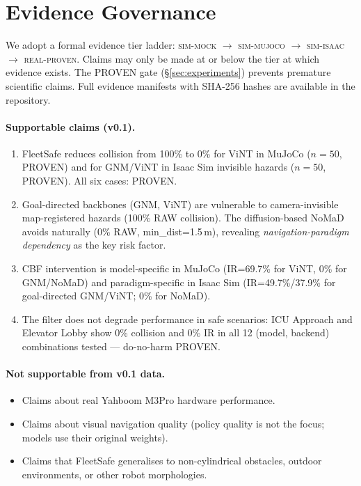 \documentclass[letterpaper]{article}
\begin{document}
\section{Evidence Governance}
\label{sec:governance}

We adopt a formal evidence tier ladder:
\textsc{sim-mock} $\to$ \textsc{sim-mujoco} $\to$ \textsc{sim-isaac}
$\to$ \textsc{real-proven}.
Claims may only be made at or below the tier at which evidence exists.
The PROVEN gate (§\ref{sec:experiments}) prevents premature scientific claims.
Full evidence manifests with SHA-256 hashes are available in the repository.

\paragraph{Supportable claims (v0.1).}
\begin{enumerate}
\item FleetSafe reduces collision from 100\% to 0\% for ViNT in MuJoCo
  ($n=50$, PROVEN) and for GNM/ViNT in Isaac Sim invisible hazards
  ($n=50$, PROVEN). All six cases: PROVEN.
\item Goal-directed backbones (GNM, ViNT) are vulnerable to
  camera-invisible map-registered hazards (100\% RAW collision).
  The diffusion-based NoMaD avoids naturally (0\% RAW, min\_dist=1.5\,m),
  revealing \emph{navigation-paradigm dependency} as the key risk factor.
\item CBF intervention is model-specific in MuJoCo (IR=69.7\% for ViNT,
  0\% for GNM/NoMaD) and paradigm-specific in Isaac Sim
  (IR=49.7\%/37.9\% for goal-directed GNM/ViNT; 0\% for NoMaD).
\item The filter does not degrade performance in safe scenarios:
  ICU Approach and Elevator Lobby show 0\% collision and 0\% IR in
  all 12 (model, backend) combinations tested — do-no-harm PROVEN.
\end{enumerate}

\paragraph{Not supportable from v0.1 data.}
\begin{itemize}
\item Claims about real Yahboom M3Pro hardware performance.
\item Claims about visual navigation quality (policy quality is not the
  focus; models use their original weights).
\item Claims that FleetSafe generalises to non-cylindrical obstacles,
  outdoor environments, or other robot morphologies.
\end{itemize}
\end{document}
